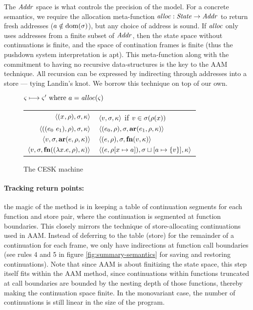 \documentclass{llncs}
\begin{document}
The $\mathit{Addr}$ space is what controls the precision of the model. For a
concrete semantics, we require the allocation meta-function $\mathit{alloc} :
\mathit{State} \to \mathit{Addr}$ to return fresh addresses ($a \notin
\text{dom}(\sigma)$), but any choice of address is sound. If $\mathit{alloc}$ only
uses addresses from a finite subset of $\mathit{Addr}$, then the state space
without continuations is finite, and the space of contination frames
is finite (thus the pushdown system interpretation is apt). This
meta-function along with the commitment to having no recursive
data-structures is the key to the AAM technique. All recursion can be
expressed by indirecting through addresses into a store --- tying
Landin's knot. We borrow this technique on top of our own.

\begin{figure}
  \centering
  $\varsigma \longmapsto \varsigma' \text{ where } a = \mathit{alloc}(\varsigma)$ \\
  \begin{tabular}{r|l}
    \hline
    $\langle (x^{{}}, \rho), \sigma, \kappa \rangle$
    &
    $\langle v,\sigma,\kappa \rangle$ if $v \in \sigma(\rho(x))$
    \\
    $\langle ((e_{0}\ e_{1}){}, \rho), \sigma, \kappa \rangle$
    &
    $\langle (e_{0}, \rho), \sigma, \mathbf{ar}{}(e_{1},\rho,\kappa) \rangle$
    \\
    $\langle v, \sigma, \mathbf{ar}{}(e,\rho,\kappa) \rangle$
    &
    $\langle (e, \rho), \sigma, \mathbf{fn}{}(v, \kappa) \rangle$
    \\
    $\langle v,\sigma,\mathbf{fn}{}((\lambda{} x. e, \rho), \kappa) \rangle$
    &
    $\langle (e, \rho[x \mapsto a]), \sigma\sqcup[a \mapsto \{ v \}], \kappa \rangle$
  \end{tabular}
  \caption{The CESK machine}
  \label{fig:base-semantics}
\end{figure}

\paragraph{Tracking return points:} the magic of the method is in
keeping a table of continuation segments for each function and store
pair, where the continuation is segmented at function boundaries. This
closely mirrors the technique of store-allocating continuations used
in AAM. Instead of deferring to the table (store) for the remainder of
a continuation for each frame, we only have indirections at function
call boundaries (see rules 4 and 5 in figure
\ref{fig:summary-semantics} for saving and restoring
continuations). Note that since AAM is about finitizing the state
space, this step itself fits within the AAM method, since
continuations within functions truncated at call boundaries are
bounded by the nesting depth of those functions, thereby making the
continuation space finite. In the monovariant case, the number of
continuations is still linear in the size of the program.
\end{document}

